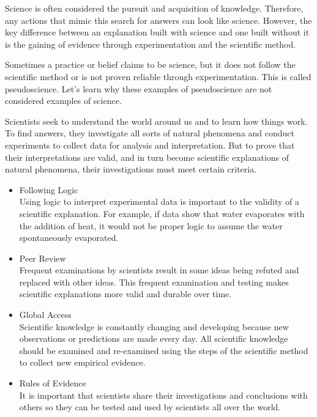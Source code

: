 
Science is often considered the pursuit and acquisition of knowledge.
Therefore, any actions that mimic this search for answers can look like
science. However, the key difference between an explanation built with science
and one built without it is the gaining of evidence through experimentation and
the scientific method.

Sometimes a practice or belief claims to be science, but it does not follow the
scientific method or is not proven reliable through experimentation. This is
called pseudoscience. Let's learn why these examples of pseudoscience are not
considered examples of science.

Scientists seek to understand the world around us and to learn how things work.
To find answers, they investigate all sorts of natural phenomena and conduct
experiments to collect data for analysis and interpretation. But to prove that
their interpretations are valid, and in turn become scientific explanations of
natural phenomena, their investigations must meet certain criteria.

\begin{itemize}
    \item Following Logic \\ Using logic to interpret experimental data is
        important to the validity of a scientific explanation. For example, if
        data show that water evaporates with the addition of heat, it would not
        be proper logic to assume the water spontaneously evaporated.
    \item Peer Review \\ Frequent examinations by scientists result in some
        ideas being refuted and replaced with other ideas. This frequent
        examination and testing makes scientific explanations more valid and
        durable over time.
    \item Global Access \\ Scientific knowledge is constantly changing and
        developing because new observations or predictions are made every day.
        All scientific knowledge should be examined and re-examined using the
        steps of the scientific method to collect new empirical evidence.
    \item Rules of Evidence \\ It is important that scientists share their
        investigations and conclusions with others so they can be tested and
        used by scientists all over the world.
\end{itemize}

